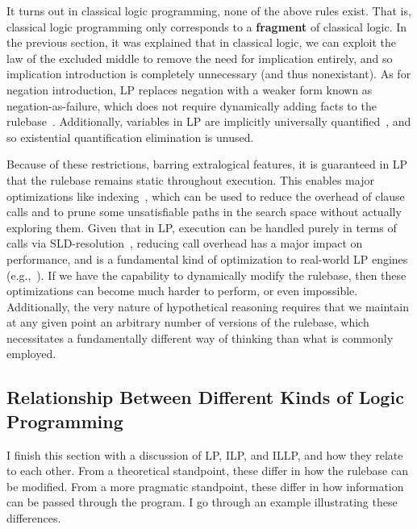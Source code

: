 It turns out in classical logic programming, none of the above rules exist.
That is, classical logic programming only corresponds to a \textbf{fragment} of classical logic.
In the previous section, it was explained that in classical logic, we can exploit the law of the excluded middle to remove the need for implication entirely, and so implication introduction is completely unnecessary (and thus nonexistant).
As for negation introduction, LP replaces negation with a weaker form known as negation-as-failure, which does not require dynamically adding facts to the rulebase~\cite{Nilsson}.
Additionally, variables in LP are implicitly universally quantified~\cite{Nilsson}, and so existential quantification elimination is unused.

Because of these restrictions, barring extralogical features, it is guaranteed in LP that the rulebase remains static throughout execution.
This enables major optimizations like indexing~\cite{Ait-Kaci:1991:WAM:113900, AICPub641:1983}, which can be used to reduce the overhead of clause calls and to prune some unsatisfiable paths in the search space without actually exploring them.
Given that in LP, execution can be handled purely in terms of calls via SLD-resolution~\cite{Nilsson, Lloyd}, reducing call overhead has a major impact on performance, and is a fundamental kind of optimization to real-world LP engines (e.g.,~\cite{wielemaker:2011:tplp, Diaz:2000:GPS:338407.338553}).
If we have the capability to dynamically modify the rulebase, then these optimizations can become much harder to perform, or even impossible.
Additionally, the very nature of hypothetical reasoning requires that we maintain at any given point an arbitrary number of versions of the rulebase, which necessitates a fundamentally different way of thinking than what is commonly employed.

\subsection{Relationship Between Different Kinds of Logic Programming}
I finish this section with a discussion of LP, ILP, and ILLP, and how they relate to each other.
From a theoretical standpoint, these differ in how the rulebase can be modified.
From a more pragmatic standpoint, these differ in how information can be passed through the program.
I go through an example illustrating these differences.


